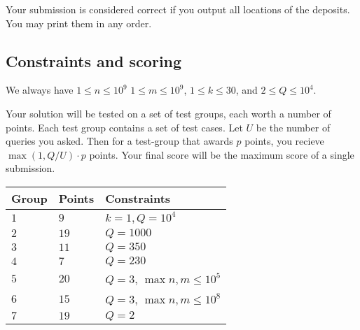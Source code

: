 Your submission is considered correct if you output all locations of the deposits.
You may print them in any order.

\subsection*{Constraints and scoring}

We always have 
$1\leq n \leq 10^9$ %
$1\leq m\leq 10^9$,  %
$1 \leq k \leq 30$, %
and
$2 \le Q \le 10^4$. %

Your solution will be tested on a set of test groups, each worth a number of points.
Each test group contains a set of test cases.
Let $U$ be the number of queries you asked. Then for a test-group that awards $p$ points, you recieve $\max(1,Q/U)\cdot p$ points.
Your final score will be the maximum score of a single submission.

\medskip
\begin{tabular}{lll}
Group & Points & Constraints \\\hline
  $1$ & $9$ & $k = 1, Q = 10^4$\\
  $2$ & $19$ & $Q = 1000$\\
  $3$ & $11$ & $Q = 350$\\
  $4$ & $7$ & $Q = 230$\\
  $5$ & $20$ & $Q = 3$, $\max{n,m} \le 10^5$\\
  $6$ & $15$ & $Q = 3$, $\max{n,m} \le 10^8$\\
  $7$ & $19$ & $Q = 2$
\end{tabular}

